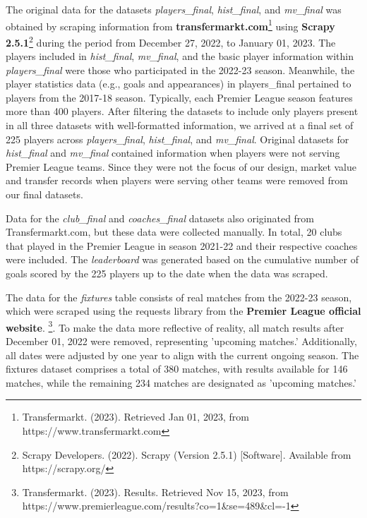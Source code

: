 \documentclass[letterpaper]{article}
\begin{document}
The original data for the datasets \textit{players\_final}, \textit{hist\_final}, and \textit{mv\_final} was obtained by scraping information from \textbf{transfermarkt.com}\footnote{Transfermarkt. (2023). Retrieved Jan 01, 2023, from https://www.transfermarkt.com} using \textbf{Scrapy 2.5.1}\footnote{Scrapy Developers. (2022). Scrapy (Version 2.5.1) [Software]. Available from https://scrapy.org/} during the period from December 27, 2022, to January 01, 2023. The players included in\textit{ hist\_final}, \textit{mv\_final}, and the basic player information within \textit{players\_final} were those who participated in the 2022-23 season. Meanwhile, the player statistics data (e.g., goals and appearances) in players\_final pertained to players from the 2017-18 season. Typically, each Premier League season features more than 400 players. After filtering the datasets to include only players present in all three datasets with well-formatted information, we arrived at a final set of 225 players across \textit{players\_final}, \textit{hist\_final}, and \textit{mv\_final}. Original datasets for \textit{hist\_final} and \textit{mv\_final} contained information when players were not serving Premier League teams. Since they were not the focus of our design, market value and transfer records when players were serving other teams were removed from our final datasets. 

Data for the \textit{club\_final }and \textit{coaches\_final} datasets also originated from Transfermarkt.com, but these data were collected manually. In total, 20 clubs that played in the Premier League in season 2021-22 and their respective coaches were included. The \textit{leaderboard} was generated based on the cumulative number of goals scored by the 225 players up to the date when the data was scraped. 

The data for the \textit{fixtures} table consists of real matches from the 2022-23 season, which were scraped using the requests library from the \textbf{Premier League official website}. \footnote{Transfermarkt. (2023). Results. Retrieved Nov 15, 2023, from https://www.premierleague.com/results?co=1\&se=489\&cl=-1}. To make the data more reflective of reality, all match results after December 01, 2022 were removed, representing 'upcoming matches.' Additionally, all dates were adjusted by one year to align with the current ongoing season. The fixtures dataset comprises a total of 380 matches, with results available for 146 matches, while the remaining 234 matches are designated as 'upcoming matches.' 
\end{document}
